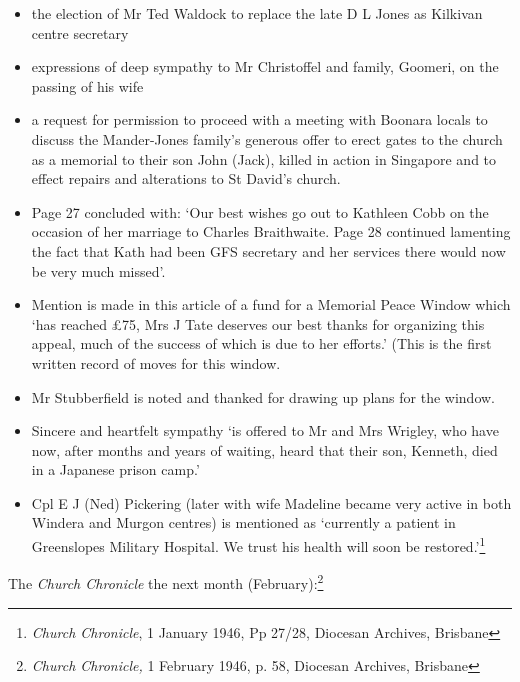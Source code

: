\begin{itemize}
\item
  the election of Mr Ted Waldock to replace the late D L Jones as
  Kilkivan centre secretary
\item
  expressions of deep sympathy to Mr Christoffel and family, Goomeri, on
  the passing of his wife
\item
  a request for permission to proceed with a meeting with Boonara locals
  to discuss the Mander-Jones family's generous offer to erect gates to
  the church as a memorial to their son John (Jack), killed in action in
  Singapore and to effect repairs and alterations to St David's church.
\item
  Page 27 concluded with: `Our best wishes go out to Kathleen Cobb on
  the occasion of her marriage to Charles Braithwaite. Page 28 continued
  lamenting the fact that Kath had been GFS secretary and her services
  there would now be very much missed'.
\item
  Mention is made in this article of a fund for a Memorial Peace Window
  which `has reached £75, Mrs J Tate deserves our best thanks for
  organizing this appeal, much of the success of which is due to her
  efforts.' (This is the first written record of moves for this window.
\item
  Mr Stubberfield is noted and thanked for drawing up plans for the
  window.
\item
  Sincere and heartfelt sympathy `is offered to Mr and Mrs Wrigley, who
  have now, after months and years of waiting, heard that their son,
  Kenneth, died in a Japanese prison camp.'
\item
  Cpl E J (Ned) Pickering (later with wife Madeline became very active
  in both Windera and Murgon centres) is mentioned as `currently a
  patient in Greenslopes Military Hospital. We trust his health will
  soon be restored.'\footnote{\emph{Church Chronicle}, 1 January 1946,
    Pp 27/28, Diocesan Archives, Brisbane}
\end{itemize}

The \emph{Church Chronicle} the next month (February):\footnote{\emph{Church
  Chronicle,} 1 February 1946, p. 58, Diocesan Archives, Brisbane}


